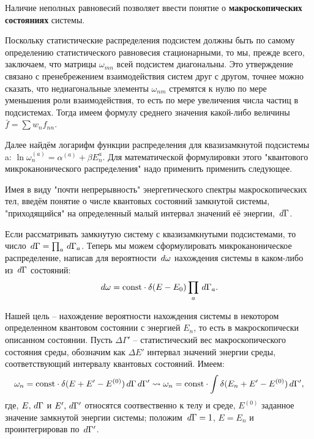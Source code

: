 Наличие неполных равновесий позволяет ввести понятие о \textbf{макроскопических состояниях} системы.

 Поскольку статистические распределения подсистем должны быть по самому определению статистического равновесия стационарными, то мы, прежде всего, заключаем, что матрицы $\omega_{m n}$ всей подсистем диагональны.
 Это утверждение связано с пренебрежением взаимодействия систем друг с другом, точнее можно сказать, что недиагональные элементы $\omega_{n m}$ стремятся к нулю по мере уменьшения роли взаимодействия, то есть по мере увеличения числа частиц в подсистемах. 
 Тогда имеем формулу среднего значения какой-либо величины $\bar{f} = \sum w_n f_{n  n}$.

Далее найдём логарифм функции распределения для квазизамкнутой подсистемы a: $\ln \omega_n^{(a)} = \alpha^{(a)} + \beta E_n^a$.
Для математической формулировки этого "квантового микроканонического распределения" надо применить применить следующее.

Имея в виду "почти непрерывность" энергетического спектры макроскопических тел, введём понятие о числе квантовых состояний замкнутой системы, "приходящийся" на определенный малый интервал значений её энергии, $\, d \Gamma$.

Если рассматривать замкнутую систему с квазизамкнутыми подсистемами, то число $\, d \Gamma = \prod_a \, d \Gamma_a$. Теперь мы можем сформулировать микроканоническое распределение, написав для вероятности $\, d \omega$ нахождения системы в каком-либо из $\, d \Gamma $ состояний:
\begin{equation}
	\, d \omega = \text{const} \cdot \delta(E -E_0) \prod_a \, d \Gamma_a.
\end{equation}

Нашей цель -- нахождение вероятности нахождения системы в некотором определенном квантовом состоянии с энергией $E_n$, то есть в макроскопически описанном состоянии.
Пусть $\Delta \Gamma'$ -- статистический вес макроскопического состояния среды, обозначим как $\Delta E'$ интервал значений энергии среды, соответствующий интервалу квантовых состояний. Имеем:
\begin{equation}
		\omega_n = \text{const} \cdot \delta(E + E' - E^{(0)})\, d \Gamma \, d \Gamma' \leadsto
		\omega_n = \text{const} \cdot \int \delta(E_n + E' - E^{(0)}) \, d \Gamma',
\end{equation}
где, $E, \, d \Gamma$ и $E', \, d \Gamma'$ относятся соотвественно к телу и среде, $E^{(0)}$ заданное значение замкнутой энергии системы; положим $\, d \Gamma = 1$, $E = E_n$ и проинтегрировав по $\, d \Gamma'$.

